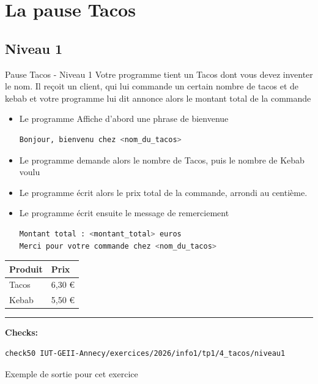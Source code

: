 
\section{La pause Tacos}
\subsection{Niveau 1}

\begin{UPSTIcahierDesCharges}{Pause Tacos - Niveau 1}
	Votre programme tient un Tacos dont vous devez inventer le nom.
	Il reçoit un client, qui lui commande un certain nombre de tacos et de kebab et votre programme lui dit annonce alors le montant total de la commande
	\begin{itemize}
		\item[$\Box$] Le programme Affiche d'abord une phrase de bienvenue
		      \begin{lstlisting}[language=bash,style=console]
Bonjour, bienvenu chez <nom_du_tacos>
\end{lstlisting}
		\item[$\Box$] Le programme demande alors le nombre de Tacos, puis le nombre de Kebab voulu
		\item[$\Box$] Le programme écrit alors le prix total de la commande, arrondi au centième.
		\item[$\Box$] Le programme écrit ensuite le message de remerciement
		      \begin{lstlisting}[language=bash,style=console]
Montant total : <montant_total> euros
Merci pour votre commande chez <nom_du_tacos>
\end{lstlisting}
	\end{itemize}
	\begin{center}
		\begin{tabular}{|l|l|}
			\hline
			Produit & Prix   \\
			\hline
			Tacos   & 6,30 € \\
			Kebab   & 5,50 € \\
			\hline
		\end{tabular}
	\end{center}
	\hrule
	\textbf{Checks:}
	\begin{lstlisting}[language=bash,style=console]
check50 IUT-GEII-Annecy/exercices/2026/info1/tp1/4_tacos/niveau1
\end{lstlisting}
\end{UPSTIcahierDesCharges}


\begin{UPSTIinfor}{Exemple de sortie pour cet exercice}
	
\end{UPSTIinfor}

